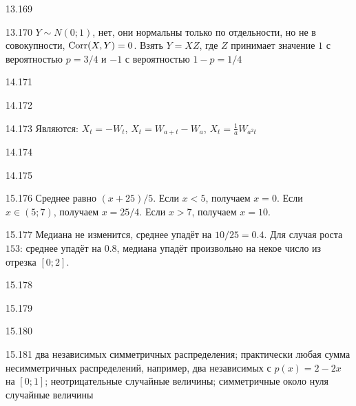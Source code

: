 \protect \hypertarget {soln:13.169}{}
\begin{solution}{{13.169}}
\end{solution}
\protect \hypertarget {soln:13.170}{}
\begin{solution}{{13.170}}
  $Y \sim N(0;1)$, нет, они нормальны только по отдельности, но не в совокупности, $\operatorname{Corr}(X,Y)=0$. Взять $Y=XZ$, где $Z$ принимает значение $1$ с вероятностью $p=3/4$ и $-1$ с вероятностью $1-p=1/4$
\end{solution}
\protect \hypertarget {soln:14.171}{}
\begin{solution}{{14.171}}
\end{solution}
\protect \hypertarget {soln:14.172}{}
\begin{solution}{{14.172}}
\end{solution}
\protect \hypertarget {soln:14.173}{}
\begin{solution}{{14.173}}
Являются: $X_{t}=-W_{t}$, $X_{t}=W_{a+t}-W_{a}$, $X_{t}=\frac{1}{a}W_{a^{2}t}$
\end{solution}
\protect \hypertarget {soln:14.174}{}
\begin{solution}{{14.174}}
\end{solution}
\protect \hypertarget {soln:14.175}{}
\begin{solution}{{14.175}}
\end{solution}
\protect \hypertarget {soln:15.176}{}
\begin{solution}{{15.176}}
Среднее равно $(x+25)/5$. Если $x<5$, получаем $x=0$. Если $x \in (5; 7)$, получаем $x=25/4$. Если $x>7$, получаем $x=10$.
\end{solution}
\protect \hypertarget {soln:15.177}{}
\begin{solution}{{15.177}}
Медиана не изменится, среднее упадёт на $10/25=0.4$. Для случая роста $153$: среднее упадёт на $0.8$, медиана упадёт произвольно на некое число из отрезка $[0;2]$.
\end{solution}
\protect \hypertarget {soln:15.178}{}
\begin{solution}{{15.178}}
\end{solution}
\protect \hypertarget {soln:15.179}{}
\begin{solution}{{15.179}}
\end{solution}
\protect \hypertarget {soln:15.180}{}
\begin{solution}{{15.180}}
\end{solution}
\protect \hypertarget {soln:15.181}{}
\begin{solution}{{15.181}}
  два независимых симметричных распределения; практически любая сумма несимметричных распределений, например, два независимых с $p(x)=2-2x$ на $[0;1]$; неотрицательные случайные величины; симметричные около нуля случайные величины
\end{solution}
